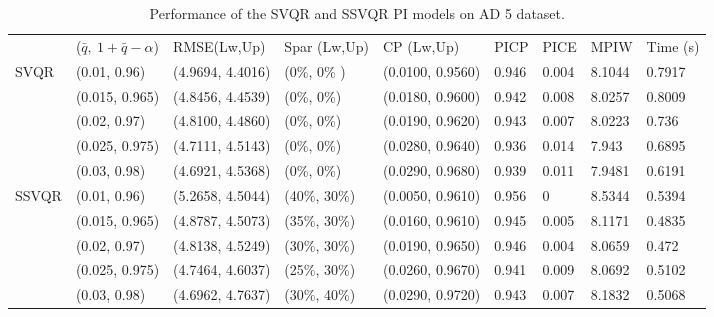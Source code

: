 \documentclass[10pt]{article} %
\begin{document}
\begin{table}
    {\fontsize{9}{9}\selectfont \begin{tabular}{|l|l|l|l|l|l|l|l|l|}
\cline{1-9}
        & ($\bar{q},~1+\bar{q}-\alpha$)               & RMSE(Lw,Up)   & Spar (Lw,Up)     & CP (Lw,Up)     & PICP  & PICE & MPIW   & Time (s) \\ \cline{1-9} 
\multirow{5}{*}{SVQR} & 
        (0.01, 0.96) & (4.9694, 4.4016) & (0\%, 0\% )& (0.0100, 0.9560) & 0.946 & 0.004 & 8.1044 & 0.7917 \\
     &   (0.015, 0.965) & (4.8456, 4.4539) & (0\%, 0\%) & (0.0180, 0.9600) & 0.942 & 0.008 & 8.0257 & 0.8009 \\ 
      &  (0.02, 0.97) & (4.8100, 4.4860) & (0\%, 0\%) & (0.0190, 0.9620) & 0.943 & 0.007 & 8.0223 & 0.736 \\ 
       & (0.025, 0.975) & (4.7111, 4.5143) & (0\%, 0\%) & (0.0280, 0.9640) & 0.936 & 0.014 & 7.943 & 0.6895 \\
      &  (0.03, 0.98) & (4.6921, 4.5368) & (0\%, 0\%) & (0.0290, 0.9680) & 0.939 & 0.011 & 7.9481 & 0.6191 \\ \hline
       \multirow{5}{*}{SSVQR}      & (0.01, 0.96) & (5.2658, 4.5044) & (40\%, 30\%) & (0.0050, 0.9610) & 0.956 & 0 & 8.5344 & 0.5394 \\ 
        & (0.015, 0.965) & (4.8787, 4.5073) & (35\%, 30\%) & (0.0160, 0.9610) & 0.945 & 0.005 & 8.1171 & 0.4835 \\ 
        & (0.02, 0.97) & (4.8138, 4.5249) & (30\%, 30\%) & (0.0190, 0.9650) & 0.946 & 0.004 & 8.0659 & 0.472 \\ 
       & (0.025, 0.975) & (4.7464, 4.6037) & (25\%, 30\%) & (0.0260, 0.9670) & 0.941 & 0.009 & 8.0692 & 0.5102 \\ 
        & (0.03, 0.98) & (4.6962, 4.7637) & (30\%, 40\%) & (0.0290, 0.9720) & 0.943 & 0.007 & 8.1832 & 0.5068 \\ \hline
    \end{tabular}}
   \caption{Performance of the SVQR and SSVQR PI models on AD 5 dataset.}
\label{AD5}
\end{table}
\end{document}
